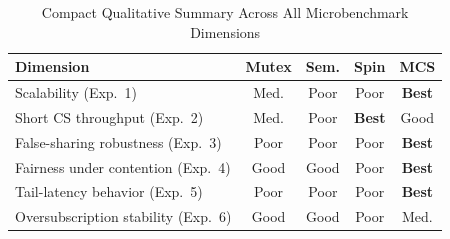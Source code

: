 \documentclass[conference]{IEEEtran}
\begin{document}
\begin{table}[!htbp]
\centering
\caption{Compact Qualitative Summary Across All Microbenchmark Dimensions}
\label{tab:summary}
\renewcommand{\arraystretch}{1.3}
\begin{tabular}{lcccc}
\toprule
\textbf{Dimension} & \textbf{Mutex} & \textbf{Sem.}
  & \textbf{Spin} & \textbf{MCS} \\
\midrule
Scalability (Exp.~1)                & Med. & Poor & Poor & \textbf{Best} \\
Short CS throughput (Exp.~2)        & Med. & Poor & \textbf{Best} & Good \\
False-sharing robustness (Exp.~3)   & Poor & Poor & Poor & \textbf{Best} \\
Fairness under contention (Exp.~4)  & Good & Good & Poor & \textbf{Best} \\
Tail-latency behavior (Exp.~5)      & Poor & Poor & Poor & \textbf{Best} \\
Oversubscription stability (Exp.~6) & Good & Good & Poor & Med. \\
\bottomrule
\end{tabular}
\end{table}



\end{document}
